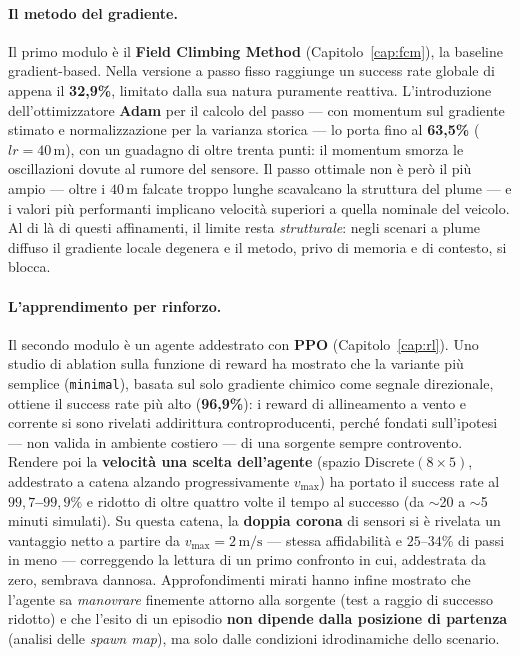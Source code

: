 \paragraph{Il metodo del gradiente.}
Il primo modulo \`e il \textbf{Field Climbing Method} (Capitolo~\ref{cap:fcm}), la baseline
gradient-based. Nella versione a passo fisso raggiunge un success rate globale di appena il
\textbf{32{,}9\%}, limitato dalla sua natura puramente reattiva. L'introduzione
dell'ottimizzatore \textbf{Adam} per il calcolo del passo --- con momentum sul gradiente
stimato e normalizzazione per la varianza storica --- lo porta fino al \textbf{63{,}5\%}
($lr = 40\,\text{m}$), con un guadagno di oltre trenta punti: il momentum smorza le
oscillazioni dovute al rumore del sensore. Il passo ottimale non \`e per\`o il pi\`u ampio
--- oltre i $40\,\text{m}$ falcate troppo lunghe scavalcano la struttura del plume --- e i
valori pi\`u performanti implicano velocit\`a superiori a quella nominale del veicolo. Al di
l\`a di questi affinamenti, il limite resta \emph{strutturale}: negli scenari a plume diffuso
il gradiente locale degenera e il metodo, privo di memoria e di contesto, si blocca.

\paragraph{L'apprendimento per rinforzo.}
Il secondo modulo \`e un agente addestrato con \textbf{PPO} (Capitolo~\ref{cap:rl}). Uno
studio di ablation sulla funzione di reward ha mostrato che la variante pi\`u semplice
(\texttt{minimal}), basata sul solo gradiente chimico come segnale direzionale, ottiene il
success rate pi\`u alto (\textbf{96{,}9\%}): i reward di allineamento a vento e corrente si
sono rivelati addirittura controproducenti, perch\'e fondati sull'ipotesi --- non valida in
ambiente costiero --- di una sorgente sempre controvento. Rendere poi la \textbf{velocit\`a
una scelta dell'agente} (spazio $\text{Discrete}(8\times5)$, addestrato a catena alzando
progressivamente $v_{\max}$) ha portato il success rate al \textbf{$99{,}7$--$99{,}9\%$} e
ridotto di oltre quattro volte il tempo al successo (da $\sim$20 a $\sim$5 minuti simulati).
Su questa catena, la \textbf{doppia corona} di sensori si \`e rivelata un vantaggio netto a
partire da $v_{\max} = 2\,\text{m/s}$ --- stessa affidabilit\`a e $25$--$34\%$ di passi in
meno --- correggendo la lettura di un primo confronto in cui, addestrata da zero, sembrava
dannosa. Approfondimenti mirati hanno infine mostrato che l'agente sa \emph{manovrare}
finemente attorno alla sorgente (test a raggio di successo ridotto) e che l'esito di un
episodio \textbf{non dipende dalla posizione di partenza} (analisi delle \emph{spawn map}),
ma solo dalle condizioni idrodinamiche dello scenario.

